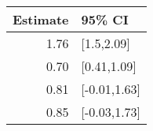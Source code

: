 \begin{tabular}{rl}
  \hline
Estimate & 95\% CI \\ 
  \hline
1.76 & [1.5,2.09] \\ 
  0.70 & [0.41,1.09] \\ 
  0.81 & [-0.01,1.63] \\ 
  0.85 & [-0.03,1.73] \\ 
   \hline
\end{tabular}

